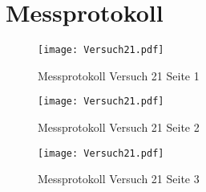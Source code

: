 \section{Messprotokoll}
\begin{figure}[h!]
    \centering
    \texttt{[image: Versuch21.pdf]}
    \caption{Messprotokoll Versuch 21 Seite 1}
\end{figure}
\clearpage
\newpage
\begin{figure}[h!]
    \centering
    \texttt{[image: Versuch21.pdf]}
    \caption{Messprotokoll Versuch 21 Seite 2}
\end{figure}
\newpage
\begin{figure}[h!]
    \centering
    \texttt{[image: Versuch21.pdf]}
    \caption{Messprotokoll Versuch 21  Seite 3}
\end{figure}
\newpage
